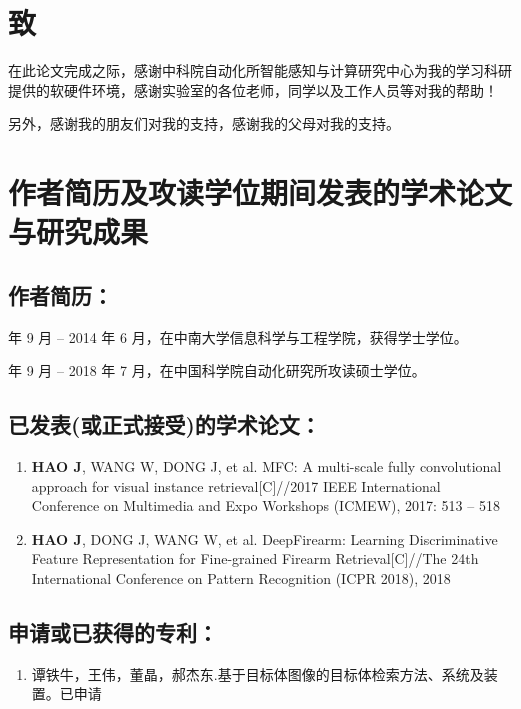 
\chapter{致}
在此论文完成之际，感谢中科院自动化所智能感知与计算研究中心为我的学习科研提供的软硬件环境，感谢实验室的各位老师，同学以及工作人员等对我的帮助！

另外，感谢我的朋友们对我的支持，感谢我的父母对我的支持。

\chapter{作者简历及攻读学位期间发表的学术论文与研究成果}

\section*{作者简历：}

 年 9 月 -- 2014 年 6 月，在中南大学信息科学与工程学院，获得学士学位。

 年 9 月 -- 2018 年 7 月，在中国科学院自动化研究所攻读硕士学位。

\section*{已发表(或正式接受)的学术论文：}

\begin{enumerate}

	\item \textbf{HAO J}, WANG W, DONG J, et al. MFC: A multi-scale fully convolutional approach for visual instance retrieval[C]//2017 IEEE International Conference on Multimedia and Expo Workshops (ICMEW), 2017: 513 -- 518

	\item \textbf{HAO J}, DONG J, WANG W, et al. DeepFirearm: Learning Discriminative Feature Representation for Fine-grained Firearm Retrieval[C]//The 24th International Conference on Pattern Recognition (ICPR 2018), 2018
\end{enumerate}

\section*{申请或已获得的专利：}

\begin{enumerate}
	\item 谭铁牛，王伟，董晶，郝杰东.基于目标体图像的目标体检索方法、系统及装置。已申请
\end{enumerate}

